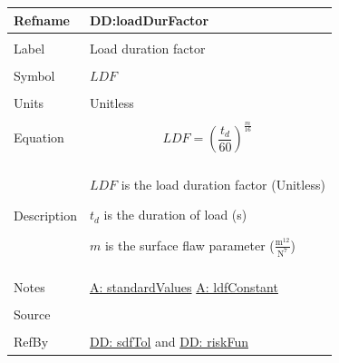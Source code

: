 \documentclass[12pt]{article}
\begin{document}
\noindent \begin{minipage}{\textwidth}
\begin{tabular}{p{} p{}}
\toprule \textbf{Refname} & \textbf{DD:loadDurFactor}
\label{DD:loadDurFactor}
\\ \midrule \\
Label & Load duration factor
\\ \midrule \\
Symbol & $LDF$
\\ \midrule \\
Units & Unitless
\\ \midrule \\
Equation & \begin{displaymath}
           LDF=\left(\frac{{t_{d}}}{60}\right)^{\frac{m}{16}}
           \end{displaymath}
\\ \midrule \\
Description & \begin{symbDescription}
              \item{$LDF$ is the load duration factor (Unitless)}
              \item{${t_{d}}$ is the duration of load (s)}
              \item{$m$ is the surface flaw parameter ($\frac{\text{m}^{12}}{\text{N}^{7}}$)}
              \end{symbDescription}
\\ \midrule \\
Notes & \hyperref[assumpSV]{A: standardValues}
        \hyperref[assumpLDFC]{A: ldfConstant}
\\ \midrule \\
Source & \cite{astm2009}
\\ \midrule \\
RefBy & \hyperref[DD:sdfTol]{DD: sdfTol} and \hyperref[DD:riskFun]{DD: riskFun}
\\ \bottomrule \end{tabular}
\end{minipage}
\par~
\end{document}
